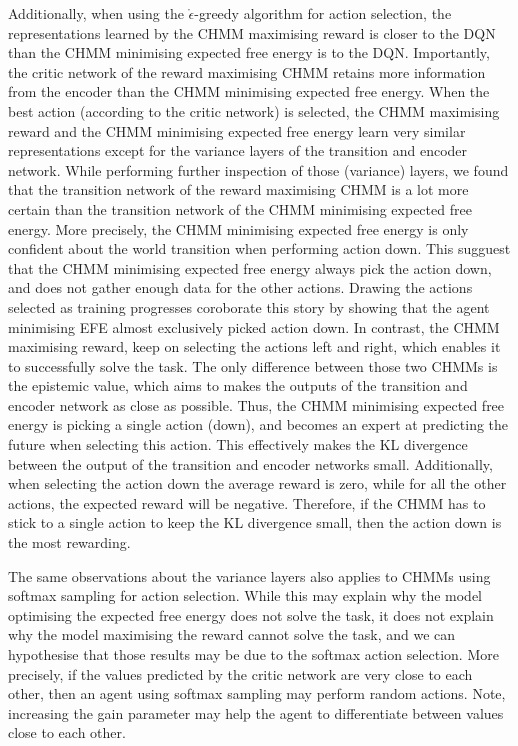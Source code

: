 \documentclass[twoside,11pt]{article}
\begin{document}
Additionally, when using the $\mathring{\epsilon}$-greedy algorithm for action selection, the representations learned by the CHMM maximising reward is closer to the DQN than the CHMM minimising expected free energy is to the DQN. Importantly, the critic network of the reward maximising CHMM retains more information from the encoder than the CHMM minimising expected free energy. When the best action (according to the critic network) is selected, the CHMM maximising reward and the CHMM minimising expected free energy learn very similar representations except for the variance layers of the transition and encoder network. While performing further inspection of those (variance) layers, we found that the transition network of the reward maximising CHMM is a lot more certain than the transition network of the CHMM minimising expected free energy. More precisely, the CHMM minimising expected free energy is only confident about the world transition when performing action down. This sugguest that the CHMM minimising expected free energy always pick the action down, and does not gather enough data for the other actions. Drawing the actions selected as training progresses coroborate this story by showing that the agent minimising EFE almost exclusively picked action down. In contrast, the CHMM maximising reward, keep on selecting the actions left and right, which enables it to successfully solve the task. The only difference between those two CHMMs is the epistemic value, which aims to makes the outputs of the transition and encoder network as close as possible. Thus, the CHMM minimising expected free energy is picking a single action (down), and becomes an expert at predicting the future when selecting this action. This effectively makes the KL divergence between the output of the transition and encoder networks small. Additionally, when selecting the action down the average reward is zero, while for all the other actions, the expected reward will be
negative. Therefore, if the CHMM has to stick to a single action to keep the KL divergence small, then the action down
is the most rewarding.

The same observations about the variance layers also applies to CHMMs using softmax sampling for action selection. While this may explain why the model optimising the expected free energy does not solve the task, it does not explain why the model maximising the reward cannot solve the task, and we can hypothesise that those results may be due to the softmax action selection. More precisely, if the values predicted by the critic network are very close to each other, then an agent using softmax sampling may perform random actions. Note, increasing the gain parameter may help the agent to differentiate between values close to each other.
\end{document}
